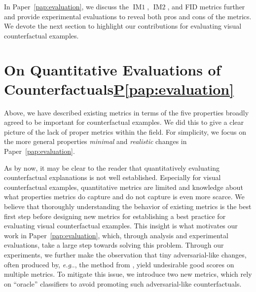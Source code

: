 \documentclass[11pt,a4paper,twoside,openright,final]{memoir}
\makeatletter
\DeclareRobustCommand\onedot{\futurelet\@let@token\@onedot}
\def\@onedot{\ifx\@let@token.\else.\null\fi\xspace}
\def\eg{\emph{e.g}\onedot} \def\Eg{\emph{E.g}\onedot}
\newcommand\contribution[1]{\hspace{0.5em}\hyperref[#1]{P\ref{#1}}}
\newcommand*{\paperref}[1]{Paper~\hyperref[#1]{\ref{#1}}}
\makeatother
\begin{document}
In \paperref{pap:evaluation}, we discuss the $\operatorname{IM1}$, $\operatorname{IM2}$, and FID metrics further and provide experimental evaluations to reveal both pros and cons of the metrics.
We devote the next section to highlight our contributions for evaluating visual counterfactual examples. 

\section{On Quantitative Evaluations of Counterfactuals\contribution{pap:evaluation}}\label{sec:evaluation-paper}

Above, we have described existing metrics in terms of the five properties broadly agreed to be important for counterfactual examples.
We did this to give a clear picture of the lack of proper metrics within the field. 
For simplicity, we focus on the more general properties \emph{minimal} and \emph{realistic} changes in \paperref{pap:evaluation}. 

As by now, it may be clear to the reader that quantitatively evaluating counterfactual explanations is not well established.
Especially for visual counterfactual examples, quantitative metrics are limited and knowledge about what properties metrics do capture and do not capture is even more scarce.
We believe that thoroughly understanding the behavior of existing metrics is the best first step before designing new metrics for establishing a best practice for evaluating visual counterfactual examples.
This insight is what motivates our work in \paperref{pap:evaluation}, which, through analysis and experimental evaluations, take a large step towards solving this problem.
Through our experiments, we further make the observation that tiny adversarial-like changes, often produced by, \eg, the method from \cite{Wachter2017}, yield undesirable good scores on multiple metrics.
To mitigate this issue, we introduce two new metrics, which rely on ``oracle'' classifiers to avoid promoting such adversarial-like counterfactuals.
\end{document}
